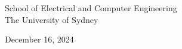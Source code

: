 \begin{titlepage}
\begin{flushleft}
\begin{center}
        \vspace{0.8cm}

        School of Electrical and Computer Engineering\\
        The University of Sydney

        \vspace{0.8cm}
        
        December 16, 2024
        
        \vspace{2cm}
        
        \end{center}
        
    \end{flushleft}
    

\end{titlepage}

